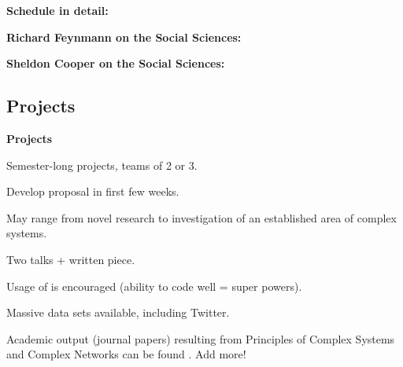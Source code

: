 \begin{frame}[plain]
  \textbf{Schedule in detail:}

  \tiny
  
    \lectureschedule
  




  \textbf{Richard Feynmann on the  Social Sciences:}
  


  
\textbf{Sheldon Cooper on the Social Sciences:}






\subsection{Projects}
  \textbf{Projects}

  
  
  
    Semester-long projects, teams of 2 or 3.
   
    Develop proposal in first few weeks.
   
    May range from novel research to investigation of an established area of complex systems.
   
    Two talks + written piece.
  
    Usage of 
    is encouraged (ability to code well = super powers).
  
    Massive data sets available, including Twitter.
  
    Academic output (journal papers) resulting from Principles
    of Complex Systems and Complex Networks can be found
    .  Add more!
  

\end{frame}
